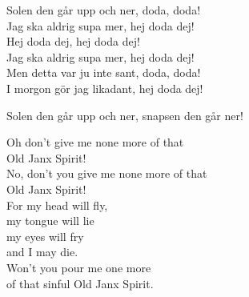 \documentclass[a6paper, 10pt, twoside]{article}
\begin{document}
\noindent
\begin{center}
\end{center}
\begin{lyrics}
Solen den går upp och ner, doda, doda! \\
Jag ska aldrig supa mer, hej doda dej! \\
Hej doda dej, hej doda dej! \\
Jag ska aldrig supa mer, hej doda dej! 
\vspace{5pt} \\
Men detta var ju inte sant, doda, doda! \\
I morgon gör jag likadant, hej doda dej! 
\end{lyrics}
\vspace{10pt}
\begin{center}
\end{center}
\begin{lyrics}
Solen den går upp och ner, snapsen den går ner!
\end{lyrics}
\vspace{25pt}
\begin{center}
\end{center}
\begin{lyrics}
Oh don't give me none more of that \\
Old Janx Spirit! \\
No, don't you give me none more of that \\
Old Janx Spirit! \\
For my head will fly, \\
my tongue will lie \\
my eyes will fry \\
and I may die. \\
Won't you pour me one more \\
of that sinful Old Janx Spirit. 
\end{lyrics}
\end{document}
